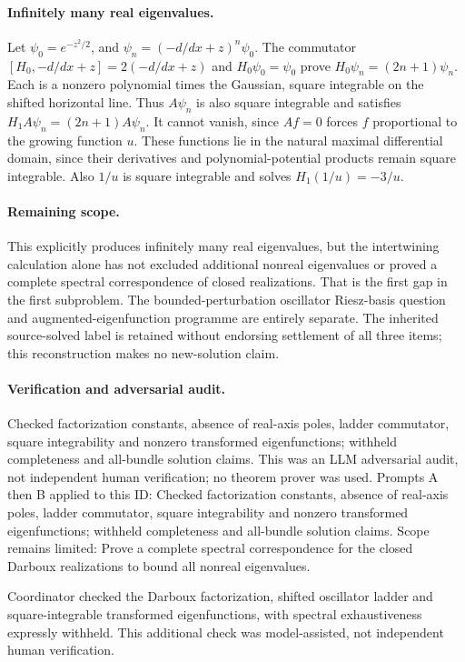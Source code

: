 \documentclass[11pt]{article}
\begin{document}
\paragraph{Infinitely many real eigenvalues.}Let \(\psi_0=e^{-z^2/2}\), and \(\psi_n=(-d/dx+z)^n\psi_0\). The commutator \([H_0,-d/dx+z]=2(-d/dx+z)\) and \(H_0\psi_0=\psi_0\) prove \(H_0\psi_n=(2n+1)\psi_n\). Each is a nonzero polynomial times the Gaussian, square integrable on the shifted horizontal line. Thus \(A\psi_n\) is also square integrable and satisfies \(H_1A\psi_n=(2n+1)A\psi_n\). It cannot vanish, since \(Af=0\) forces \(f\) proportional to the growing function \(u\). These functions lie in the natural maximal differential domain, since their derivatives and polynomial-potential products remain square integrable. Also \(1/u\) is square integrable and solves \(H_1(1/u)=-3/u\).
\paragraph{Remaining scope.}This explicitly produces infinitely many real eigenvalues, but the intertwining calculation alone has not excluded additional nonreal eigenvalues or proved a complete spectral correspondence of closed realizations. That is the first gap in the first subproblem. The bounded-perturbation oscillator Riesz-basis question and augmented-eigenfunction programme are entirely separate. The inherited source-solved label is retained without endorsing settlement of all three items; this reconstruction makes no new-solution claim.

\paragraph{Verification and adversarial audit.}
Checked factorization constants, absence of real-axis poles, ladder commutator, square integrability and nonzero transformed eigenfunctions; withheld completeness and all-bundle solution claims. This was an LLM adversarial audit, not independent human verification; no theorem prover was used. Prompts A then B applied to this ID: Checked factorization constants, absence of real-axis poles, ladder commutator, square integrability and nonzero transformed eigenfunctions; withheld completeness and all-bundle solution claims. Scope remains limited: Prove a complete spectral correspondence for the closed Darboux realizations to bound all nonreal eigenvalues.

Coordinator checked the Darboux factorization, shifted oscillator ladder and square-integrable transformed eigenfunctions, with spectral exhaustiveness expressly withheld. This additional check was model-assisted, not independent human verification.
\end{document}
